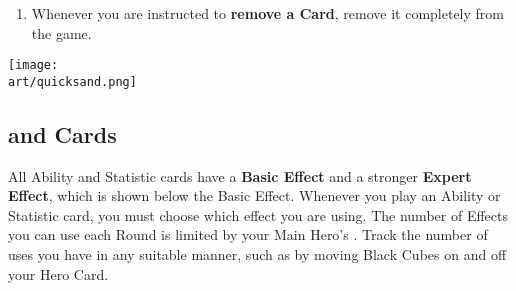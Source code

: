 \begin{multicols*}{2}
\begin{enumerate}
  \begin{itemize}
    \item \textbf{Instant}  Effects are resolved immediately.
    \item \textbf{Activation}  Effects must be played when Activating your own Unit in Combat.
    \item \textbf{Map}  Effects cannot be used during Combat.
    \item \textbf{Ongoing}  Effects last until they are used up or until the player who played them starts their next Turn (whichever happens first).
      \begin{expansion}[before skip balanced=0.3em,]{stronghold,conflux,cove}
      \parbox{0.75\hsize}{You can use Time Tokens to track the duration of Ongoing Effects.}
      \end{expansion}
    \item \textbf{Permanent}  Cards stay in play until discarded or replaced.
      They are played the same way as  and  Cards.
      \textbf{You may only have one permanent Card at a time}; playing another discards the first.
      While a Permanent Card is in play, you may use either its Basic or Expert Effect, but not both simultaneously.
  \end{itemize}
  \item Whenever you are instructed to \textbf{remove a Card}, remove it completely from the game.
\end{enumerate}

\vfill
\hfill{\texttt{[image: \\art/quicksand.png]}}

\clearpage

\subsection*{ and  Cards}

All Ability and Statistic cards have a \textbf{Basic Effect} and a stronger \textbf{Expert}  \textbf{Effect}, which is shown below the Basic Effect.
Whenever you play an Ability or Statistic card, you must choose which effect you are using.
The number of  Effects you can use each Round is limited by your Main Hero's .
Track the number of uses you have in any suitable manner, such as by moving Black Cubes on and off your Hero Card.\par
\bigskip


\end{multicols*}
